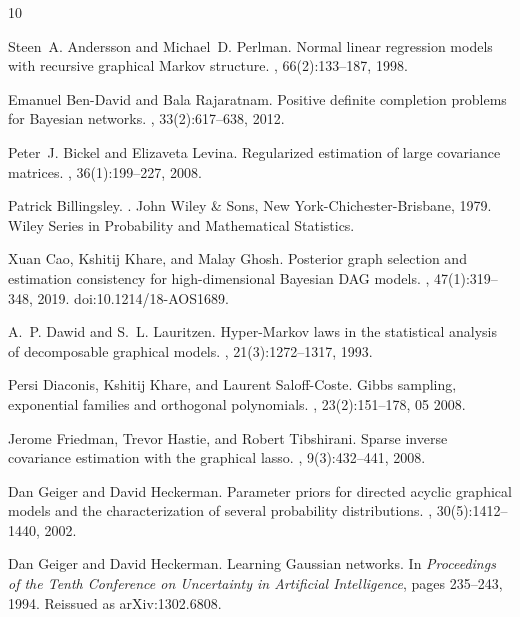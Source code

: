 \documentclass[12pt]{article}
\theoremstyle{plain}
\theoremstyle{definition}
\theoremstyle{remark}
\begin{document}
\begin{thebibliography}{10}

Steen~A. Andersson and Michael~D. Perlman.
\newblock Normal linear regression models with recursive graphical {M}arkov
  structure.
, 66(2):133--187, 1998.

Emanuel Ben-David and Bala Rajaratnam.
\newblock Positive definite completion problems for {B}ayesian networks.
, 33(2):617--638, 2012.

Peter~J. Bickel and Elizaveta Levina.
\newblock Regularized estimation of large covariance matrices.
, 36(1):199--227, 2008.

Patrick Billingsley.
.
\newblock John Wiley \& Sons, New York-Chichester-Brisbane, 1979.
\newblock Wiley Series in Probability and Mathematical Statistics.

Xuan Cao, Kshitij Khare, and Malay Ghosh.
\newblock Posterior graph selection and estimation consistency for
  high-dimensional Bayesian {DAG} models.
, 47(1):319--348, 2019.
\newblock doi:10.1214/18-AOS1689.

A.~P. Dawid and S.~L. Lauritzen.
\newblock Hyper-{M}arkov laws in the statistical analysis of decomposable
  graphical models.
, 21(3):1272--1317, 1993.

Persi Diaconis, Kshitij Khare, and Laurent Saloff-Coste.
\newblock Gibbs sampling, exponential families and orthogonal polynomials.
, 23(2):151--178, 05 2008.

Jerome Friedman, Trevor Hastie, and Robert Tibshirani.
\newblock Sparse inverse covariance estimation with the graphical lasso.
, 9(3):432--441, 2008.

Dan Geiger and David Heckerman.
\newblock Parameter priors for directed acyclic graphical models and the
  characterization of several probability distributions.
, 30(5):1412--1440, 2002.

Dan Geiger and David Heckerman.
\newblock Learning {G}aussian networks.
\newblock In {\em Proceedings of the Tenth Conference on Uncertainty in
  Artificial Intelligence}, pages 235--243, 1994.
\newblock Reissued as arXiv:1302.6808.


\end{thebibliography}
\end{document}
